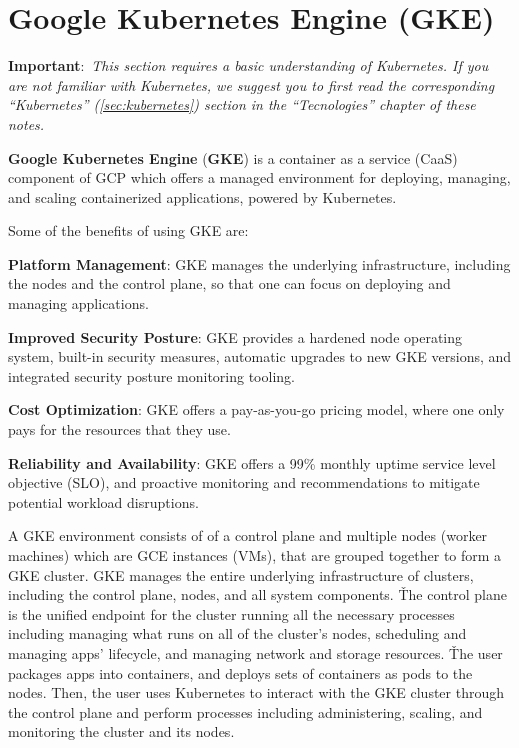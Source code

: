 \section{Google Kubernetes Engine (GKE)}

\textbf{Important}:~\textit{This section requires a basic understanding of Kubernetes. If you are not familiar with
Kubernetes, we suggest you to first read the corresponding ``Kubernetes'' (\ref{sec:kubernetes}) section in the
``Tecnologies'' chapter of these notes.}

\textbf{Google Kubernetes Engine} (\textbf{GKE}) is a container as a service (CaaS) component of GCP which offers
a managed environment for deploying, managing, and scaling containerized applications, powered by Kubernetes.
\ed

Some of the benefits of using GKE are:
\bit
\item \textbf{Platform Management}: GKE manages the underlying infrastructure, including the nodes and the control
plane, so that one can focus on deploying and managing applications.
\item \textbf{Improved Security Posture}: GKE provides a hardened node operating system, built-in security measures,
automatic upgrades to new GKE versions, and integrated security posture monitoring tooling.
\item \textbf{Cost Optimization}: GKE offers a pay-as-you-go pricing model, where one only pays for the resources
that they use.
\item \textbf{Reliability and Availability}: GKE offers a 99\% monthly uptime service level objective (SLO), and
proactive monitoring and recommendations to mitigate potential workload disruptions.
\eit

A GKE environment consists of of a control plane and multiple nodes (worker machines) which are GCE instances (VMs),
that are grouped together to form a GKE cluster. GKE manages the entire underlying infrastructure of clusters,
including the control plane, nodes, and all system components. \v

The control plane is the unified endpoint for the cluster running all the necessary processes including managing
what runs on all of the cluster's nodes, scheduling and managing apps' lifecycle, and managing network and storage
resources. \v

The user packages apps into containers, and deploys sets of containers as pods to the nodes. Then, the user uses
Kubernetes to interact with the GKE cluster through the control plane and perform processes including administering,
scaling, and monitoring the cluster and its nodes.


